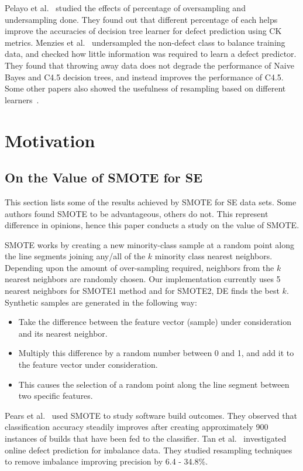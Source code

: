 \documentclass[sigconf,review, anonymous]{acmart}
\newcommand{\bi}{\begin{itemize}[leftmargin=0.4cm]}
\newcommand{\ei}{\end{itemize}}
\theoremstyle{break}
\theoremstyle{break}
\begin{document}
Pelayo et al.~\cite{pelayo2007applying} studied the effects of percentage of oversampling and undersampling done. They found out that different percentage of each helps improve the accuracies of decision tree learner for defect prediction using CK metrics. Menzies et al.~\cite{menzies2008implications} undersampled the non-defect class to balance training
data, and checked how little information was required to learn a defect predictor. They found that throwing away data does not degrade the performance of Naive Bayes and C4.5 decision trees, and instead improves the performance of C4.5. Some other papers also showed the usefulness of resampling based on different learners~\cite{pelayo2007applying, pelayo2012evaluating, riquelme2008finding}.

\section{Motivation}

\subsection{On the Value of SMOTE for SE}
\label{sect:smote}

This section lists some of the results achieved by SMOTE for SE data sets. Some authors found SMOTE to be advantageous, others do not. This represent difference in opinions, hence this paper conducts a study on the value of SMOTE.

SMOTE works by creating a new minority-class sample at a random point along the line
segments joining any/all of the $k$ minority class nearest neighbors. Depending upon the
amount of over-sampling required, neighbors from the $k$ nearest neighbors are randomly
chosen. Our implementation currently uses 5 nearest neighbors for SMOTE1 method and for SMOTE2, DE finds the best $k$. Synthetic samples
are generated in the following way:
\bi
\item
Take the difference between the feature vector (sample)
under consideration and its nearest neighbor.
\item
Multiply this difference by a random number
between 0 and 1, and add it to the feature vector under consideration.
\item
This causes the
selection of a random point along the line segment between two specific features.
\ei
Pears et al.~\cite{pears2014synthetic} used SMOTE to study software build outcomes. They observed
that classification accuracy steadily improves after creating approximately 900 instances of builds that have been fed to the classifier. Tan et al.~\cite{tan2015online} investigated online defect prediction for imbalance data. They studied resampling techniques to remove imbalance improving precision by 6.4 - 34.8\%.
\end{document}
